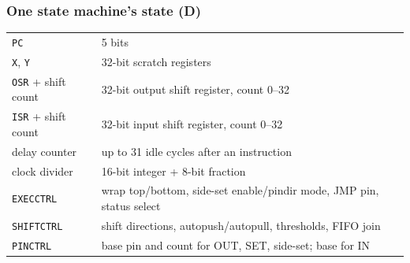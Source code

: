\subsubsection{One state machine's state (D)}
\begin{center}
\begin{tabular}{|l|l|}
\hline
\texttt{PC} & 5 bits \\
\texttt{X}, \texttt{Y} & 32-bit scratch registers \\
\texttt{OSR} + shift count & 32-bit output shift register, count 0--32 \\
\texttt{ISR} + shift count & 32-bit input shift register, count 0--32 \\
delay counter & up to 31 idle cycles after an instruction \\
clock divider & 16-bit integer + 8-bit fraction \\
\texttt{EXECCTRL} & wrap top/bottom, side-set enable/pindir mode, JMP pin,
  status select \\
\texttt{SHIFTCTRL} & shift directions, autopush/autopull, thresholds, FIFO
  join \\
\texttt{PINCTRL} & base pin and count for OUT, SET, side-set; base for IN
  \\ \hline
\end{tabular}
\end{center}

